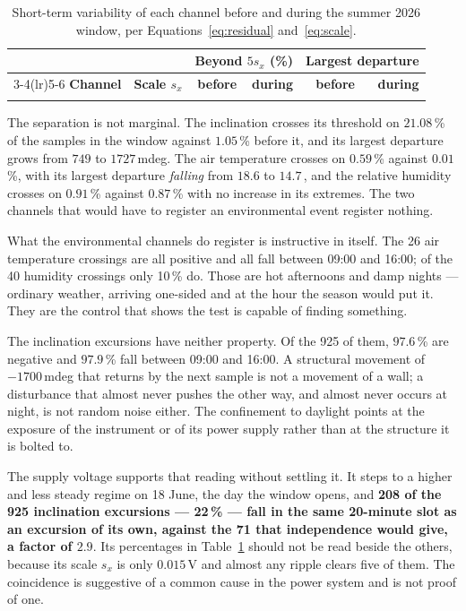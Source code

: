 \documentclass[11pt,a4paper]{article}
\begin{document}
\begin{table}[H]
\centering
\small
\begin{tabular}{lrrrrr}
\toprule
& & \multicolumn{2}{c}{\textbf{Beyond $5s_x$ (\%)}} &
\multicolumn{2}{c}{\textbf{Largest departure}} \\
\cmidrule(lr){3-4}\cmidrule(lr){5-6}
\textbf{Channel} & \textbf{Scale $s_x$} & \textbf{before} & \textbf{during} &
\textbf{before} & \textbf{during} \\
\midrule

\\
\bottomrule
\end{tabular}
\caption{Short-term variability of each channel before and during the summer 2026 window, per Equations~\eqref{eq:residual} and~\eqref{eq:scale}.}
\label{tab:anomaly}
\end{table}

The separation is not marginal. The inclination crosses its threshold on $21.08$\,\% of the samples in the window against $1.05$\,\% before it, and its largest departure grows from $749$ to $1727$\,mdeg. The air temperature crosses on $0.59$\,\% against $0.01$\,\%, with its largest departure \emph{falling} from $18.6$ to $14.7$\,\degC, and the relative humidity crosses on $0.91$\,\% against $0.87$\,\% with no increase in its extremes. The two channels that would have to register an environmental event register nothing.

What the environmental channels do register is instructive in itself. The 26 air temperature crossings are all positive and all fall between 09:00 and 16:00; of the 40 humidity crossings only 10\,\% do. Those are hot afternoons and damp nights --- ordinary weather, arriving one-sided and at the hour the season would put it. They are the control that shows the test is capable of finding something.

The inclination excursions have neither property. Of the 925 of them, $97.6$\,\% are negative and $97.9$\,\% fall between 09:00 and 16:00. A structural movement of $-1700$\,mdeg that returns by the next sample is not a movement of a wall; a disturbance that almost never pushes the other way, and almost never occurs at night, is not random noise either. The confinement to daylight points at the exposure of the instrument or of its power supply rather than at the structure it is bolted to.

The supply voltage supports that reading without settling it. It steps to a higher and less steady regime on 18 June, the day the window opens, and \textbf{208 of the 925 inclination excursions --- 22\,\% --- fall in the same 20-minute slot as an excursion of its own, against the 71 that independence would give, a factor of $2.9$}. Its percentages in Table~\ref{tab:anomaly} should not be read beside the others, because its scale $s_x$ is only $0.015$\,V and almost any ripple clears five of them. The coincidence is suggestive of a common cause in the power system and is not proof of one.
\end{document}
